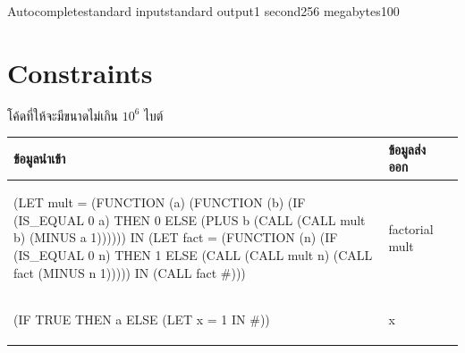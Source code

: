 \documentclass[11pt,a4paper]{article}
\begin{document}
\begin{problem}{Autocomplete}{standard input}{standard output}{1 second}{256 megabytes}{100}
\section*{Constraints}

  โค้ดที่ให้จะมีขนาดไม่เกิน $10^6$ ไบต์

\Examples

  \begin{tabular}{|M{12cm}|M{3.5cm}|N}
    \hline
    \textbf{ข้อมูลนำเข้า} & \textbf{ข้อมูลส่งออก} & \\[5pt]
    \hline \hline


    {\begin{codetumso}
(LET mult = (FUNCTION (a)
              (FUNCTION (b)
                (IF (IS_EQUAL 0 a)
                 THEN 0
                 ELSE (PLUS b (CALL (CALL mult b)
                                    (MINUS a 1)))))) IN
  (LET fact = (FUNCTION (n)
                (IF (IS_EQUAL 0 n)
                 THEN 1
                 ELSE (CALL (CALL mult n)
                            (CALL fact
                                  (MINUS n 1))))) IN
    (CALL fact #)))
    \end{codetumso}} & {\begin{codetumso}
factorial
mult
    \end{codetumso}}
    \\ \hline


    {\begin{codetumso}
(IF TRUE THEN a ELSE (LET x = 1 IN #))
    \end{codetumso}} & {\begin{codetumso}
x
    \end{codetumso}} \\ \hline
\end{tabular}

\end{problem}
\end{document}
